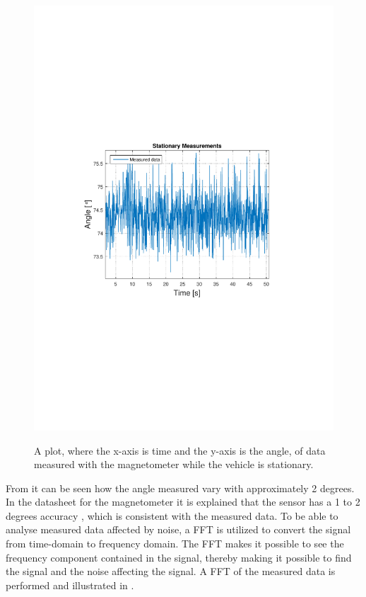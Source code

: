 \begin{figure}[H]
  \centering
  {
    \includegraphics[width=1.1\textwidth]{figures/StationaryMeasurementsMagnato.pdf}
  }
  \caption{A plot, where the x-axis is time and the y-axis is the angle, of data measured with the magnetometer while the vehicle is stationary.}
  \label{fig:StationaryMeasurementsMagnato}
\end{figure}

From  it can be seen how the angle measured vary with approximately 2 degrees. In the datasheet for the magnetometer it is explained that the sensor has a 1 to 2 degrees accuracy \cite{MagnoDatasheet}, which is consistent with the measured data. To be able to analyse measured data affected by noise, a FFT is utilized to convert the signal from time-domain to frequency domain. The FFT makes it possible to see the frequency component contained in the signal, thereby making it possible to find the signal and the noise affecting the signal. A FFT of the measured data is performed and illustrated in .

